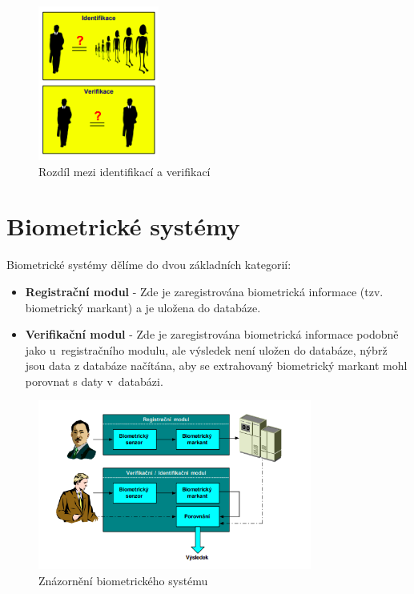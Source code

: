 \begin{figure}[!htbp]
    \centering
    \includegraphics[width=150px]{obrazky-figures/identifver.png}
    \caption{Rozdíl mezi identifikací a verifikací \cite{Drahansky}}
\end{figure}



\section{Biometrické systémy}
Biometrické systémy dělíme do dvou základních kategorií: \cite{Drahansky}
\begin{itemize}
    \item \textbf{Registrační modul} - Zde je zaregistrována biometrická informace (tzv. biometrický markant) a je uložena do databáze.
    \item \textbf{Verifikační modul} - Zde je zaregistrována biometrická informace podobně jako u~registračního modulu, ale výsledek není uložen do databáze, nýbrž jsou data z databáze načítána, aby se extrahovaný biometrický markant mohl porovnat s daty v~databázi. 
\end{itemize}

\begin{figure}[!htbp]
    \centering
    \includegraphics[width=340px]{obrazky-figures/biosystem.png}
    \caption{Znázornění biometrického systému \cite{Drahansky}}
\end{figure}

